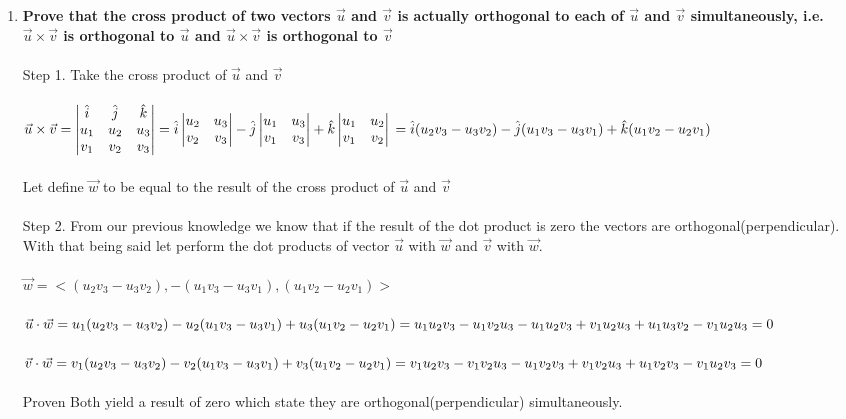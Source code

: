 \documentclass{article}
\begin{document}
\begin{enumerate}[3.]
	\item\textbf{Prove that the cross product of two vectors $\vec{u}$ and $\vec{v}$ is actually orthogonal to each of $\vec{u}$ and $\vec{v}$ simultaneously, i.e. $\vec{u}\times\vec{v}$ is orthogonal to $\vec{u}$ and $\vec{u}\times\vec{v}$ is
	      orthogonal to $\vec{v}$ }
	\\
	\\
	Step 1. Take the cross product of $\vec{u}$ and $\vec{v}$\\
	\\
	$\vec{u}\times\vec{v}=\begin{vmatrix}
	\hat{i}&\hat{j}&\hat{k}\\
	u_{1}&u_{2}&u_{3}\\
	v_{1}&v_{2}&v_{3}\\
	\end{vmatrix}=\hat{i}
	\begin{vmatrix}
		u_{2} & u_{3} \\
		v_{2} & v_{3} \\
	\end{vmatrix}-\hat{j}\begin{vmatrix}
	u_{1}&u_{3}\\
	v_{1}&v_{3}\\
	\end{vmatrix}+\hat{k}\begin{vmatrix}
	u_{1}&u_{2}\\
	v_{1}&v_{2}\\
	\end{vmatrix}\\
	=\hat{i}(u_{2}v_{3}-u_{3}v_{2})-\hat{j}(u_{1}v_{3}-u_{3}v_{1})+\hat{k}(u_{1}v_{2}-u_{2}v_{1})$\\
	\\
	Let define $\vec{w}$ to be equal to the result of the cross product of $\vec{u}$ and $\vec{v}$\\
	\\
	Step 2. From our previous knowledge we know that if the result of the dot product is zero the vectors are orthogonal(perpendicular). With that being said let perform the dot products of vector $\vec{u}$ with $\vec{w}$ and $\vec{v}$ with $\vec{w}$.\\
	\\
	$\vec{w} = <(u_{2}v_{3}-u_{3}v_{2}),-(u_{1}v_{3}-u_{3}v_{1}),(u_{1}v_{2}-u_{2}v_{1})>$\\
	\\
	$\vec{u}\cdot\vec{w}=u_{1}(u_{2}v_{3}-u_{3}v_{2})-u_{2}(u_{1}v_{3}-u_{3}v_{1})+u_{3}(u_{1}v_{2}-u_{2}v_{1})\\=u_{1}u_{2}v_{3}-u_{1}v_{2}u_{3}-u_{1}u_{2}v_{3}+v_{1}u_{2}u_{3}+u_{1}u_{3}v_{2}-v_{1}u_{2}u_{3}=0$\\
	\\ 
	$\vec{v}\cdot\vec{w}=v_{1}(u_{2}v_{3}-u_{3}v_{2})-v_{2}(u_{1}v_{3}-u_{3}v_{1})+v_{3}(u_{1}v_{2}-u_{2}v_{1})\\=v_{1}u_{2}v_{3}-v_{1}v_{2}u_{3}-u_{1}v_{2}v_{3}+v_{1}v_{2}u_{3}+u_{1}v_{2}v_{3}-v_{1}u_{2}v_{3}=0$\\
	\\
	Proven Both yield a result of zero which state they are orthogonal(perpendicular) simultaneously.
\end{enumerate}
\end{document}
